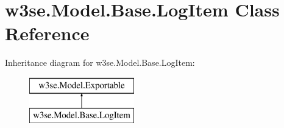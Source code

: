 \hypertarget{classw3se_1_1_model_1_1_base_1_1_log_item}{\section{w3se.\-Model.\-Base.\-Log\-Item Class Reference}
\label{classw3se_1_1_model_1_1_base_1_1_log_item}
}
Inheritance diagram for w3se.\-Model.\-Base.\-Log\-Item\-:\begin{figure}[H]
\begin{center}
\leavevmode
\includegraphics[height=2.000000cm]{classw3se_1_1_model_1_1_base_1_1_log_item}
\end{center}
\end{figure}
